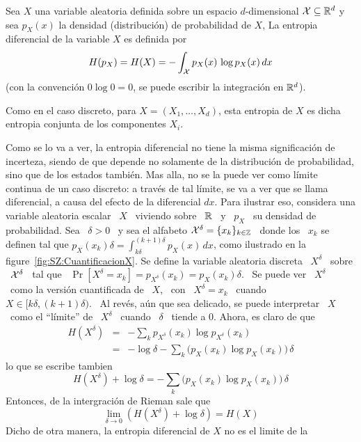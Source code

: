 \begin{definicion}\label{def:SZ:EntropiaDiferencial}
  Sea $X$ una  variable aleatoria definida sobre un  espacio $d$-dimensional $\mathcal{X}
  \subseteq \mathbb{R}^d$ y sea $p_X(x)$ la densidad (distribuci\'on) de probabilidad
  de $X$, La entropia diferencial de la variable $X$ es definida por
  \[
  H(p_X) = H(X) = - \int_{\mathcal{X}} p_X(x) \, \log p_X(x) \, dx
  \]
  (con la  convenci\'on $0 \log  0 = 0$,  se puede escribir la  integraci\'on en
  $\mathbb{R}^d$).
\end{definicion}
%
Como en el  caso discreto, para $X = (X_1,\ldots,X_d)$, esta  entropia de $X$ es
dicha entropia conjunta de los componentes $X_i$.

Como se lo  va a ver, la entropia diferencial no  tiene la misma significaci\'on
de  incerteza,  siendo de  que  depende no  solamente  de  la distribuci\'on  de
probabilidad, sino que  de los estados tambi\'en.  Mas alla, no  se la puede ver
como l\'imite continua de un caso discreto:  a trav\'es de tal l\'imite, se va a
ver que se  llama diferencial, a causa del efecto de  la diferencial $dx$.  Para
ilustrar eso, considera una variable aleatoria  escalar \ $X$ \ viviendo sobre \
$\mathbb{R}$ \ y \  $p_X$ \ su densidad de probabilidad.  Sea \ $\delta  > 0$ \ y sea
el alfabeto $\mathcal{X}^\delta = \{ x_k \}_{k \in \mathbb{Z}}$ \ donde los \ $x_k$ se definen
tal que  $\displaystyle p_X(x_k) \delta = \int_{k  \delta}^{(k+1) \delta} p_X(x)
\, dx$, como ilustrado  en la figure~\ref{fig:SZ:CuantificacionX}.  Se define la
variable  aleatoria discreta  \ $X^\delta$  \ sobre  \ $\mathcal{X}^\delta$  \ tal  que \
$\Pr[X^\delta =  x_k] = p_{X^\delta}(x_k) =  p_X(x_k) \delta$. \ Se  puede ver \
$X^\delta$ \ como la versi\'on cuantificada de \ $X$, \ con \ $X^\delta = x_k$ \
cuando  \ $X \in  [k \delta  , (k+1)  \delta )$.   \ Al  rev\'es, a\'un  que sea
delicado, se  puede interpretar \ $X$ \  como el ``l\'imite'' de  \ $X^\delta$ \
cuando \ $\delta$ \ tiende a 0. Ahora, es claro de que
%
\begin{eqnarray*}
H(X^\delta) & = & - \sum_k p_{X^\delta}(x_k) \log p_{X^\delta}(x_k)\\[2.5mm]
%
& = & - \log \delta - \sum_k \Big( p_X(x_k) \log p_X(x_k) \Big) \, \delta
\end{eqnarray*}
%
lo que se escribe tambien
%
\[
H(X^\delta)  + \log  \delta =  - \sum_k  \Big( p_X(x_k)  \log p_X(x_k)  \Big) \,
\delta
\]
%
Entonces, de la intergraci\'on de Rieman sale que
%
\[
\lim_{\delta \to 0} \left( H(X^\delta) + \log \delta \right) = H(X)
\]
%
Dicho de  otra manera,  la entropia  diferencial de $X$  no es  el limite  de la
